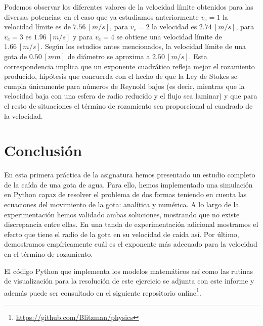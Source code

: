 \documentclass[journal]{IEEEtran}
\begin{document}
Podemos observar los diferentes valores de la velocidad límite obtenidos para las diversas potencias: en el caso que ya estudiamos anteriormente $v_e = 1$ la velocidad límite es de $7.56~[m/s]$, para $v_e = 2$ la velocidad es $2.74~[m/s]$, para $v_e = 3$ es $1.96~[m/s]$ y para $v_e = 4$ se obtiene una velocidad límite de $1.66~[m/s]$. Según los estudios antes mencionados, la velocidad límite de una gota de $0.50~[mm]$ de diámetro se aproxima a $2.50~[m/s]$. Esta
correspondencia implica que un exponente cuadrático refleja mejor el rozamiento producido, hipótesis que concuerda con el hecho de que la Ley de Stokes se cumpla únicamente para números de Reynold bajos (es decir, mientras que la velocidad baja con una esfera de radio reducido y el flujo sea laminar) y que para el resto de situaciones el término de rozamiento sea proporcional al cuadrado de la velocidad.

\section{Conclusión}

En esta primera práctica de la asignatura hemos presentado un estudio completo de la caída de una gota de agua. Para ello, hemos implementado una simulación en Python capaz de resolver el problema de dos formas teniendo en cuenta las ecuaciones del movimiento de la gota: analítica y numérica. A lo largo de la experimentación hemos validado ambas soluciones, mostrando que no existe discrepancia entre ellas. En una tanda de experimentación adicional mostramos el efecto que tiene el
radio de la gota en su velocidad de caída así. Por último, demostramos empíricamente cuál es el exponente más adecuado para la velocidad en el término de rozamiento.

El código Python que implementa los modelos matemáticos así como las rutinas de visualización para la resolución de este ejercicio se adjunta con este informe y además puede ser consultado en el siguiente repositorio online\footnote{\url{https://github.com/Blitzman/physics}}.

\ifCLASSOPTIONcaptionsoff
  \newpage
\fi

\end{document}
